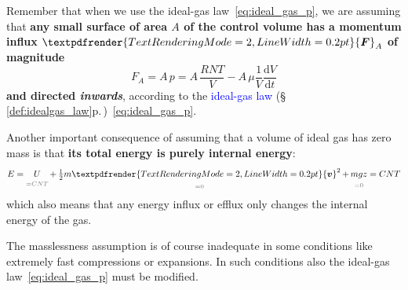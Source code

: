 \documentclass[a4paper,12pt,%
onecolumn,oneside,%
british%
]{memoir}
\renewcommand*{\bm}[1]{\textpdfrender{TextRenderingMode=2,LineWidth=0.2pt}{\boldsymbol{#1}}}
\newcommand*{\di}{\mathrm{d}}%
\renewcommand*{\|}[1][]{\nonscript\:#1\vert\nonscript\:\mathopen{}}
\newcommand*{\sect}{\S}%
\renewcommand*{\autoref}[3][\sect\,\ref]{\textcolor{blue}{#3} {\color{blue}\scriptsize(\faIcon[regular]{eye}\;#1{#2}\;p.\,\pageref{#2})}}
\newcommand*{\yvis}{\mu} %
\newcommand*{\yv}{\bm{v}}
\newcommand*{\dt}{\di t}
\newcommand*{\yN}{N}
\newcommand*{\ym}{m}%
\newcommand*{\yE}{E}
\newcommand*{\yU}{U}
\newcommand*{\yF}{\bm{F}}
\newcommand*{\ypr}{p} %
\newcommand*{\yT}{T}%
\begin{document}
Remember that when we use the ideal-gas law~\eqref{eq:ideal_gas_p}, we are assuming that \textbf{any small surface of area $A$ of the control volume has a momentum influx $\yF_{A}$ of magnitude}
\begin{equation*}
  F_{A} = A\,\ypr = A\,\frac{R \yN \yT}{V} - A\,\yvis \frac{1}{V}\frac{\di V}{\dt}
\end{equation*}
\textbf{and directed \emph{inwards}}, according to the \autoref{def:idealgas_law}{ideal-gas law}~\eqref{eq:ideal_gas_p}.

\medskip

Another important consequence of assuming that a volume of ideal gas has zero mass is that \textbf{its total energy is purely internal energy}:
\begin{equation*}
  \yE =
 \underbracket[0pt]{\yU}_{\mathcolor{midgrey}{{}=C N \yT}}
  + \underbracket[0pt]{\tfrac12\ym\yv^{2}}_{\mathcolor{midgrey}{{}=0}}
  + \underbracket[0pt]{\ym g z}_{\mathcolor{midgrey}{{}=0}}
  = C N \yT
\end{equation*}
which also means that any energy influx or efflux only changes the internal energy of the gas.

The masslessness assumption is of course inadequate in some conditions like extremely fast compressions or expansions. In such conditions also the ideal-gas law~\eqref{eq:ideal_gas_p} must be modified.

\end{document}
